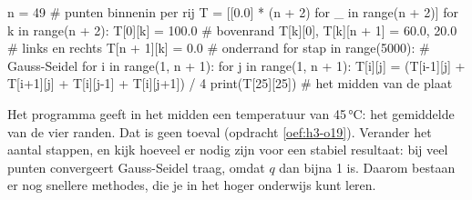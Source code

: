 \begin{python}
n = 49                                   # punten binnenin per rij
T = [[0.0] * (n + 2) for _ in range(n + 2)]
for k in range(n + 2):
    T[0][k] = 100.0                      # bovenrand
    T[k][0], T[k][n + 1] = 60.0, 20.0    # links en rechts
    T[n + 1][k] = 0.0                    # onderrand
for stap in range(5000):                 # Gauss-Seidel
    for i in range(1, n + 1):
        for j in range(1, n + 1):
            T[i][j] = (T[i-1][j] + T[i+1][j] + T[i][j-1] + T[i][j+1]) / 4
print(T[25][25])                         # het midden van de plaat
\end{python}

Het programma geeft in het midden een temperatuur van 45\,°C: het gemiddelde van de vier randen. Dat is geen toeval (opdracht \ref{oef:h3-o19}). Verander het aantal stappen, en kijk hoeveel er nodig zijn voor een stabiel resultaat: bij veel punten convergeert Gauss-Seidel traag, omdat $q$ dan bijna 1 is. Daarom bestaan er nog snellere methodes, die je in het hoger onderwijs kunt leren.

\opdrachtenkop

\begin{oefeningen}




















\end{oefeningen}


